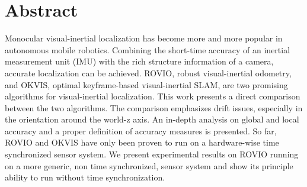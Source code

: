 \chapter*{Abstract}

Monocular visual-inertial localization has become more and more popular in autonomous mobile robotics. Combining the short-time accuracy of an inertial measurement unit (IMU) with the rich structure information of a camera, accurate localization can be achieved. ROVIO, robust visual-inertial odometry, and OKVIS, optimal keyframe-based visual-inertial SLAM, are two promising algorithms for visual-inertial localization. This work presents a direct comparison between the two algorithms. The comparison emphasizes drift issues, especially in the orientation around the world-z axis. An in-depth analysis on global and local accuracy and a proper definition of accuracy measures is presented. So far, ROVIO and OKVIS have only been proven to run on a hardware-wise time synchronized sensor system. We present experimental results on ROVIO running on a more generic, non time synchronized, sensor system and show its principle ability to run without time synchronization.










